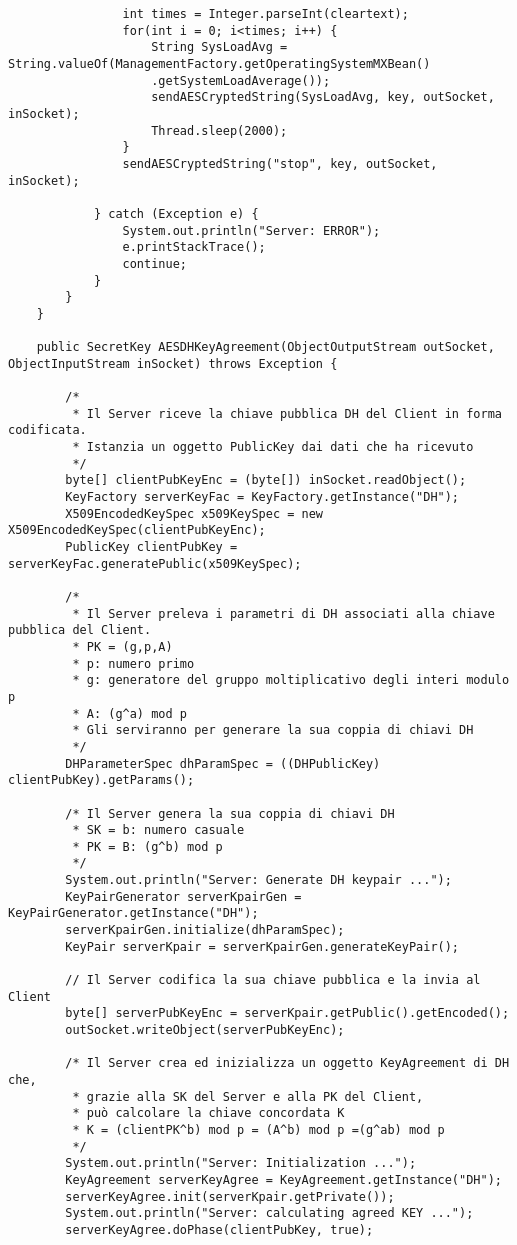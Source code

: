 \documentclass[12pt]{article}
\begin{document}
\begin{lstlisting}
				int times = Integer.parseInt(cleartext);
				for(int i = 0; i<times; i++) {
					String SysLoadAvg = String.valueOf(ManagementFactory.getOperatingSystemMXBean()
					.getSystemLoadAverage());
					sendAESCryptedString(SysLoadAvg, key, outSocket, inSocket);
					Thread.sleep(2000);
				}
				sendAESCryptedString("stop", key, outSocket, inSocket);

			} catch (Exception e) {
				System.out.println("Server: ERROR");
				e.printStackTrace();
				continue;
			}
		}
	}

	public SecretKey AESDHKeyAgreement(ObjectOutputStream outSocket, ObjectInputStream inSocket) throws Exception {

		/*
		 * Il Server riceve la chiave pubblica DH del Client in forma codificata.
		 * Istanzia un oggetto PublicKey dai dati che ha ricevuto
		 */
		byte[] clientPubKeyEnc = (byte[]) inSocket.readObject();
		KeyFactory serverKeyFac = KeyFactory.getInstance("DH");
		X509EncodedKeySpec x509KeySpec = new X509EncodedKeySpec(clientPubKeyEnc);
		PublicKey clientPubKey = serverKeyFac.generatePublic(x509KeySpec);

		/*
		 * Il Server preleva i parametri di DH associati alla chiave pubblica del Client.
		 * PK = (g,p,A)
		 * p: numero primo
		 * g: generatore del gruppo moltiplicativo degli interi modulo p
		 * A: (g^a) mod p
		 * Gli serviranno per generare la sua coppia di chiavi DH
		 */
		DHParameterSpec dhParamSpec = ((DHPublicKey) clientPubKey).getParams();

		/* Il Server genera la sua coppia di chiavi DH
		 * SK = b: numero casuale
		 * PK = B: (g^b) mod p
		 */
		System.out.println("Server: Generate DH keypair ...");
		KeyPairGenerator serverKpairGen = KeyPairGenerator.getInstance("DH");
		serverKpairGen.initialize(dhParamSpec);
		KeyPair serverKpair = serverKpairGen.generateKeyPair();

		// Il Server codifica la sua chiave pubblica e la invia al Client
		byte[] serverPubKeyEnc = serverKpair.getPublic().getEncoded();
		outSocket.writeObject(serverPubKeyEnc);

		/* Il Server crea ed inizializza un oggetto KeyAgreement di DH che,
		 * grazie alla SK del Server e alla PK del Client,
		 * può calcolare la chiave concordata K
		 * K = (clientPK^b) mod p = (A^b) mod p =(g^ab) mod p
		 */
		System.out.println("Server: Initialization ...");
		KeyAgreement serverKeyAgree = KeyAgreement.getInstance("DH");
		serverKeyAgree.init(serverKpair.getPrivate());
		System.out.println("Server: calculating agreed KEY ...");
		serverKeyAgree.doPhase(clientPubKey, true);


\end{lstlisting}
\end{document}
